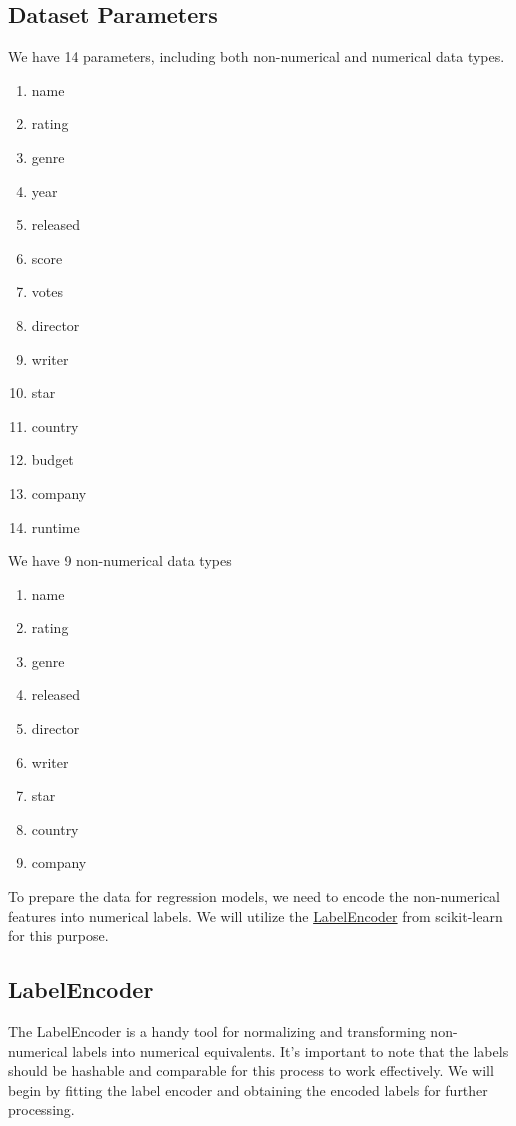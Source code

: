 \documentclass[conference]{IEEEtran}
\begin{document}
    \subsection{Dataset Parameters}
        We have 14 parameters, including both non-numerical and numerical data types.
        
        \begin{enumerate}
            \item name
            \item rating
            \item genre
            \item year
            \item released
            \item score
            \item votes
            \item director
            \item writer
            \item star
            \item country
            \item budget
            \item company
            \item runtime
        \end{enumerate}
        
        We have 9 non-numerical data types
        \begin{enumerate}
            \item name
            \item rating
            \item genre
            \item released
            \item director
            \item writer
            \item star
            \item country
            \item company
        \end{enumerate}
        
        To prepare the data for regression models, we need to encode the non-numerical features into numerical labels. We will utilize the \href{https://scikit-learn.org/stable/modules/generated/sklearn.preprocessing.LabelEncoder.html}{LabelEncoder} from scikit-learn for this purpose.
        
        \subsection*{LabelEncoder}
            The LabelEncoder is a handy tool for normalizing and transforming non-numerical labels into numerical equivalents. It's important to note that the labels should be hashable and comparable for this process to work effectively. We will begin by fitting the label encoder and obtaining the encoded labels for further processing.
            
\end{document}
